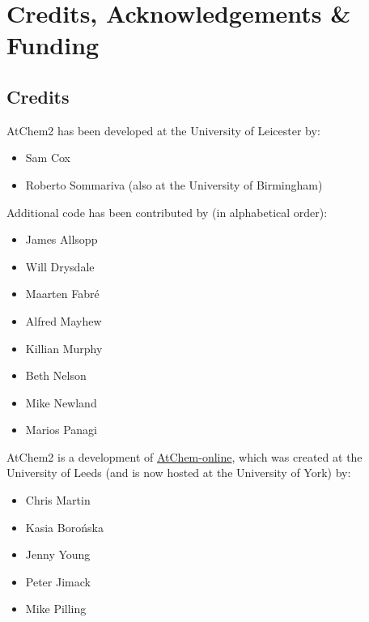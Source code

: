 %
%
%
%

\chapter{Credits, Acknowledgements \& Funding} \label{ch:credits}

\setlength{\parindent}{0pt}

\section{Credits} \label{sec:credits}

AtChem2 has been developed at the University of Leicester by:

\begin{itemize}
\item Sam Cox
\item Roberto Sommariva (also at the University of Birmingham)
\end{itemize}

Additional code has been contributed by (in alphabetical order):

\begin{itemize}
\item James Allsopp
\item Will Drysdale
\item Maarten Fabr{\'e}
\item Alfred Mayhew
\item Killian Murphy
\item Beth Nelson
\item Mike Newland
\item Marios Panagi
\end{itemize}

AtChem2 is a development of \href{https://atchem.york.ac.uk}{AtChem-online},
which was created at the University of Leeds (and is now hosted at the
University of York) by:

\begin{itemize}
\item Chris Martin
\item Kasia Boro{\'n}ska
\item Jenny Young
\item Peter Jimack
\item Mike Pilling
\end{itemize}

